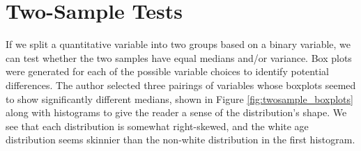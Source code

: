 
\section{Two-Sample Tests}

\par If we split a quantitative variable into two groups based on a binary variable, we can test whether the two samples have equal medians and/or variance. Box plots were generated for each of the possible variable choices to identify potential differences. The author selected three pairings of variables whose boxplots  seemed to show significantly different medians, shown in Figure \ref{fig:twosample_boxplots} along with histograms to give the reader a sense of the distribution's shape. We see that each distribution is somewhat right-skewed, and the white age distribution seems skinnier than the non-white distribution in the first histogram.

